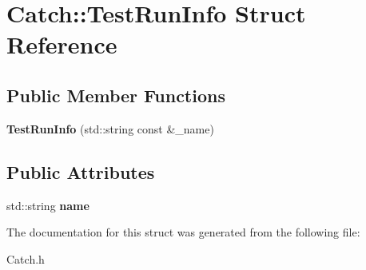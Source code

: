 \hypertarget{struct_catch_1_1_test_run_info}{\section{Catch\-:\-:Test\-Run\-Info Struct Reference}
\label{struct_catch_1_1_test_run_info}
}
\subsection*{Public Member Functions}
\begin{DoxyCompactItemize}
\item 
\hypertarget{struct_catch_1_1_test_run_info_afb422b8d6e849134b669551b91d977b8}{{\bfseries Test\-Run\-Info} (std\-::string const \&\-\_\-name)}\label{struct_catch_1_1_test_run_info_afb422b8d6e849134b669551b91d977b8}

\end{DoxyCompactItemize}
\subsection*{Public Attributes}
\begin{DoxyCompactItemize}
\item 
\hypertarget{struct_catch_1_1_test_run_info_a20bd016d4066e066b6f72f218ad389fd}{std\-::string {\bfseries name}}\label{struct_catch_1_1_test_run_info_a20bd016d4066e066b6f72f218ad389fd}

\end{DoxyCompactItemize}


The documentation for this struct was generated from the following file\-:\begin{DoxyCompactItemize}
\item 
Catch.\-h\end{DoxyCompactItemize}
